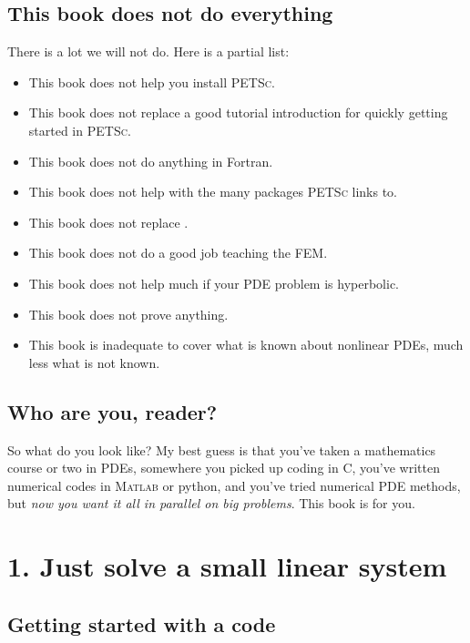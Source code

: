 \documentclass{tufte-book}
\newcommand{\Matlab}{\textsc{Matlab}\xspace}
\newcommand{\PETSc}{\textsc{PETSc}\xspace}
\begin{document}
\section{This book does not do everything}  There is a lot we will not do.  Here is a partial list:\begin{itemize}
\item This book does not help you install \PETSc.
\item This book does not replace a good tutorial introduction for quickly getting started in \PETSc.
\item This book does not do anything in Fortran.
\item This book does not help with the many packages \PETSc links to.
\item This book does not replace \citep{Smithetal1996}.
\item This book does not do a good job teaching the FEM.
\item This book does not help much if your PDE problem is hyperbolic.
\item This book does not prove anything.
\item This book is inadequate to cover what is known about nonlinear PDEs, much less what is not known.
\end{itemize}


\section{Who are you, reader?}  

So what do you look like? My best guess is that you've taken a mathematics course or two in PDEs, somewhere you picked up coding in C, you've written numerical codes in \Matlab or python, and you've tried numerical PDE methods, but \emph{now you want it all in parallel on big problems}.  This book is for you.


\mainmatter


\chapter{1. Just solve a small linear system}

\section{Getting started with a code}
\end{document}
